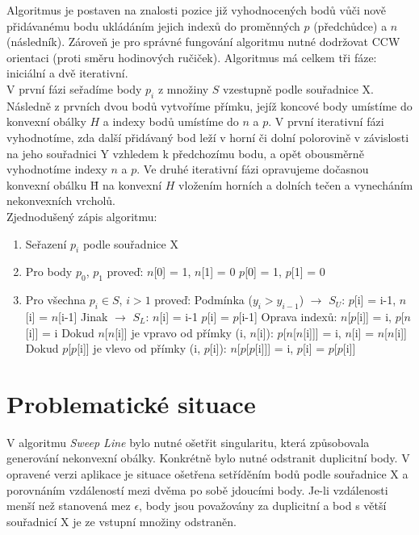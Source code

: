 \documentclass[a4paper, 12pt]{article}
\begin{document}
Algoritmus je postaven na znalosti pozice již vyhodnocených bodů vůči nově přidá\-vanému bodu ukládáním jejich indexů do proměnných $p$ (předchůdce) a $n$ (následník). Zároveň je pro správné fungování algoritmu nutné dodržovat CCW orientaci (proti směru hodinových ručiček). Algoritmus má celkem tři fáze: iniciální a dvě iterativní.\\

V první fázi seřadíme body $p_i$ z množiny $S$ vzestupně podle souřadnice X. Následně z prvních dvou bodů vytvoříme přímku, jejíž koncové body umístíme do konvexní obálky $H$ a indexy bodů umístíme do $n$ a $p$. V první iterativní fázi vyhodnotíme, zda další přidávaný bod leží v horní či dolní polorovině v závislosti na jeho souřadnici Y vzhledem k předchozímu bodu, a opět obousměrně vyhodnotíme indexy $n$ a $p$. Ve druhé iterativní fázi opravujeme dočasnou konvexní obálku \={H} na konvexní $H$ vložením horních a dolních tečen a vynecháním nekonvexních vrcholů.\\

Zjednodušený zápis algoritmu: 
\begin{enumerate}
\item Seřazení $p_i$ podle souřadnice X
\item Pro body $p_0$, $p_1$ proveď:
\subitem $n$[0] = 1, $n$[1] = 0
\subitem $p$[0] = 1, $p$[1] = 0
\item Pro všechna $p_i \in S$, $i > 1$ proveď:
\subitem Podmínka ($y_i > y_{i-1}$) $\rightarrow$ $S_U$: $p$[i] = i-1, $n$[i] = $n$[i-1]
\subitem Jinak $\rightarrow$ $S_L$: $n$[i] = i-1 $p$[i] = $p$[i-1]
\subitem Oprava indexů: $n$[$p$[i]] = i, $p$[$n$[i]] = i
\subitem Dokud $n$[$n$[i]] je vpravo od přímky (i, $n$[i]):
\subsubitem $p$[$n$[$n$[i]]] = i, $n$[i] = $n$[$n$[i]]
\subitem Dokud $p$[$p$[i]] je vlevo od přímky (i, $p$[i]):
\subsubitem $n$[$p$[$p$[i]]] = i, $p$[i] = $p$[$p$[i]]
\end{enumerate}

\section{Problematické situace}
V algoritmu \textit{Sweep Line} bylo nutné ošetřit singularitu, která způsobovala generování nekonvexní obálky. Konkrétně bylo nutné odstranit duplicitní body. V opravené verzi aplikace je situace ošetřena setříděním bodů podle souřadnice X a porovnáním vzdáleností mezi dvěma po sobě jdoucími body. Je-li vzdálenosti menší než stanovená mez $\epsilon$, body jsou považovány za duplicitní a bod s větší souřadnicí X je ze vstupní množiny odstraněn. \\
\end{document}
